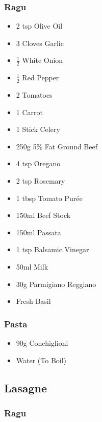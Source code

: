 \documentclass[11pt, english]{article}
\begin{document}
		\subsubsection*{Ragu}

	\begin{itemize}
        \setlength\itemsep{0cm}
		\item 2 tsp Olive Oil
		\item 3 Cloves Garlic
		\item $\frac{1}{2}$ White Onion
		\item $\frac{1}{2}$ Red Pepper
		\item 2 Tomatoes
		\item 1 Carrot
		\item 1 Stick Celery
		\item 250g 5\% Fat Ground Beef
		\item 4 tsp Oregano
		\item 2 tsp Rosemary
		\item 1 tbsp Tomato Pur\'{e}e
		\item 150ml Beef Stock
		\item 150ml Passata
		\item 1 tsp Balsamic Vinegar
		\item 50ml Milk
		\item 30g Parmigiano Reggiano
		\item Fresh Basil
        \end{itemize}

		\subsubsection*{Pasta}

	\begin{itemize}
        \setlength\itemsep{0cm}
                \item 90g Conchiglioni
		\item Water (To Boil)
        \end{itemize}

\newpage

	\subsection{Lasagne}

		\subsubsection*{Ragu}
\end{document}
